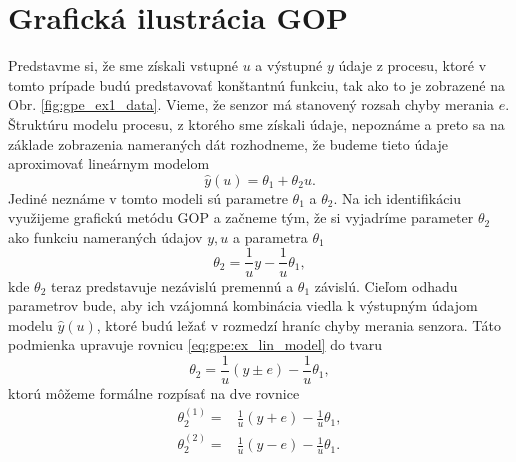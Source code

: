 \section{Grafická ilustrácia GOP}
Predstavme si, že sme získali vstupné $ u $ a výstupné $ y $ údaje z procesu, ktoré v tomto prípade budú predstavovať konštantnú funkciu, tak ako to je zobrazené na Obr. \ref{fig:gpe_ex1_data}. Vieme, že senzor má stanovený rozsah chyby merania $ e $. Štruktúru modelu procesu, z ktorého sme získali údaje, nepoznáme a preto sa na základe zobrazenia nameraných dát rozhodneme, že budeme tieto údaje aproximovať lineárnym modelom
\begin{equation}
	\hat{y}(u) = \theta_1 + \theta_2u.
\end{equation}
Jediné neznáme v tomto modeli sú parametre $ \theta_1 $ a $ \theta_2 $. Na ich identifikáciu využijeme grafickú metódu GOP a začneme tým, že si vyjadríme parameter $ \theta_2 $ ako funkciu nameraných údajov $ y, u $ a parametra $ \theta_1 $
\begin{equation} 
\label{eq:gpe:ex_lin_model}
	\theta_2 = \frac{1}{u}y - \frac{1}{u}\theta_1,
\end{equation}
kde $ \theta_2 $ teraz predstavuje nezávislú premennú a $ \theta_1 $ závislú. Cieľom odhadu parametrov bude, aby ich vzájomná kombinácia viedla k výstupným údajom modelu $ \hat{y}(u) $, ktoré budú ležať v rozmedzí hraníc chyby merania senzora. Táto podmienka upravuje rovnicu \ref{eq:gpe:ex_lin_model} do tvaru
\begin{equation}
	\theta_2 = \frac{1}{u}\left(y \pm e\right) - \frac{1}{u}\theta_1,
\end{equation}
ktorú môžeme formálne rozpísať na dve rovnice 
\begin{align}
	\label{eq:gpe_ex1_line_upper}
	\theta_2^{(1)} =& \frac{1}{u}\left(y + e\right) - \frac{1}{u}\theta_1,\\
	\label{eq:gpe_ex1_line_lower}
	\theta_2^{(2)} =& \frac{1}{u}\left(y - e\right) - \frac{1}{u}\theta_1.
\end{align}


